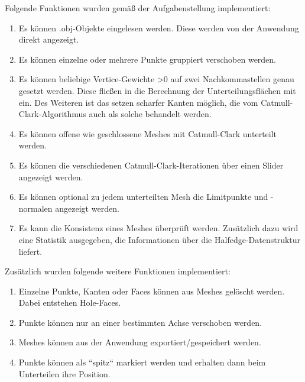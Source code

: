 Folgende Funktionen wurden gemä\ss{} der Aufgabenstellung implementiert:
\begin{enumerate}
\item Es können .obj-Objekte eingelesen werden. Diese werden von der Anwendung direkt angezeigt.
\item Es können einzelne oder mehrere Punkte gruppiert verschoben werden. 
\item Es können beliebige Vertice-Gewichte >0 auf zwei Nachkommastellen genau gesetzt werden. Diese flie\ss{}en in die Berechnung der Unterteilungsflächen mit ein. 
Des Weiteren ist das setzen scharfer Kanten möglich, die vom Catmull-Clark-Algorithmus auch als solche behandelt werden.
\item Es können offene wie geschlossene Meshes mit Catmull-Clark unterteilt werden. 
\item Es können die verschiedenen Catmull-Clark-Iterationen über einen Slider angezeigt werden. 
\item Es können optional zu jedem unterteilten Mesh die Limitpunkte und -normalen angezeigt werden.
\item Es kann die Konsistenz eines Meshes überprüft werden. Zusätzlich dazu wird eine Statistik ausgegeben, die Informationen über die Halfedge-Datenstruktur liefert. 
\end{enumerate}

Zusätzlich wurden folgende weitere Funktionen implementiert:
\begin{enumerate}
\item Einzelne Punkte, Kanten oder Faces können aus Meshes gelöscht werden. Dabei entstehen Hole-Faces.
\item Punkte können nur an einer bestimmten Achse verschoben werden.
\item Meshes können aus der Anwendung exportiert/gespeichert werden.
\item Punkte können als ``spitz`` markiert werden und erhalten dann beim Unterteilen ihre Position.
\end{enumerate}